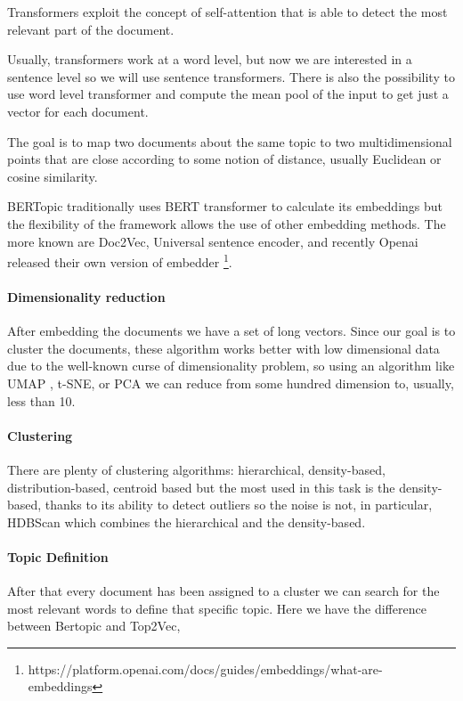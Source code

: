 Transformers exploit the concept of self-attention that is able to detect the most relevant part of the document. 

Usually, transformers work at a word level, but now we are interested in a sentence level so we will use sentence transformers. There is also the possibility to use word level transformer and compute the mean pool of the input to get just a vector for each document.

The goal is to map two documents about the same topic to two multidimensional points that are close according to some notion of distance, usually Euclidean or cosine similarity.

BERTopic traditionally uses BERT transformer to calculate its embeddings but the flexibility of the framework allows the use of other embedding methods. The more known are Doc2Vec, Universal sentence encoder, and recently Openai released their own version of embedder \footnote{https://platform.openai.com/docs/guides/embeddings/what-are-embeddings}.

\paragraph{Dimensionality reduction}
After embedding the documents we have a set of long vectors. Since our goal is to cluster the documents, these algorithm works better with low dimensional data due to the well-known curse of dimensionality problem, so using an algorithm like UMAP \cite{McInnes2018}, t-SNE, or PCA we can reduce from some hundred dimension to, usually, less than 10. 

\paragraph{Clustering}
There are plenty of clustering algorithms: hierarchical, density-based, distribution-based, centroid based
but the most used in this task is the density-based, thanks to its ability to detect outliers so the noise is not, in particular, HDBScan \cite{mcinnes_hdbscan_2017} which combines the hierarchical and the density-based.

\paragraph{Topic Definition}
After that every document has been assigned to a cluster we can search for the most relevant words to define that specific topic. Here we have the difference between Bertopic and Top2Vec,

